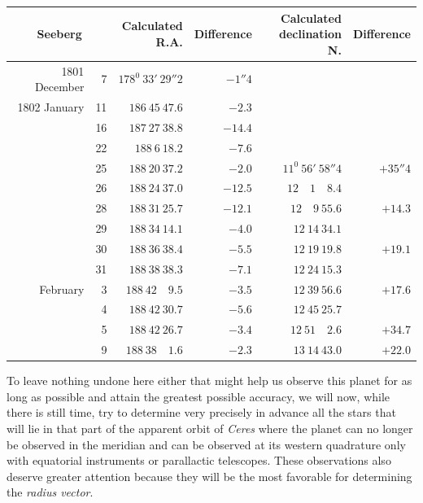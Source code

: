 \begin{center}
{\small\setlength{\tabcolsep}{4pt}
\begin{tabular}{r r|r|r|r|r}
\multicolumn{2}{c|}{Seeberg}&\shortstack{Calculated\\R.A.}&Difference&\shortstack{Calculated\\declination N.}&Difference\\\hline
1801 December&7&$178^0\ 33'\ 29''2$&$-1''4$&&\\
1802 January&11&$186\ 45\ 47.6$&$-2.3$&&\\
&16&$187\ 27\ 38.8$&$-14.4$&&\\
&22&$188\ 6\ 18.2$&$-7.6$&&\\
&25&$188\ 20\ 37.2$&$-2.0$&$11^0\ 56'\ 58''4$&$+35''4$\\
&26&$188\ 24\ 37.0$&$-12.5$&$12\quad1\quad8.4$&\\
&28&$188\ 31\ 25.7$&$-12.1$&$12\quad9\ 55.6$&$+14.3$\\
&29&$188\ 34\ 14.1$&$-4.0$&$12\ 14\ 34.1$&\\
&30&$188\ 36\ 38.4$&$-5.5$&$12\ 19\ 19.8$&$+19.1$\\
&31&$188\ 38\ 38.3$&$-7.1$&$12\ 24\ 15.3$&\\
February&3&$188\ 42\quad9.5$&$-3.5$&$12\ 39\ 56.6$&$+17.6$\\
&4&$188\ 42\ 30.7$&$-5.6$&$12\ 45\ 25.7$&\\
&5&$188\ 42\ 26.7$&$-3.4$&$12\ 51\quad2.6$&$+34.7$\\
&9&$188\ 38\quad1.6$&$-2.3$&$13\ 14\ 43.0$&$+22.0$
\end{tabular}}
\end{center}
\expandafter\def\csname HistoricalNoteText18\endcsname{To leave nothing undone here either that might help us observe this planet for as long as possible and attain the greatest possible accuracy, we will now, while there is still time, try to determine very precisely in advance all the stars that will lie in that part of the apparent orbit of \textit{Ceres} where the planet can no longer be observed in the meridian and can be observed at its western quadrature only with equatorial instruments or parallactic telescopes. These observations also deserve greater attention because they will be the most favorable for determining the \textit{radius vector}.}
%
